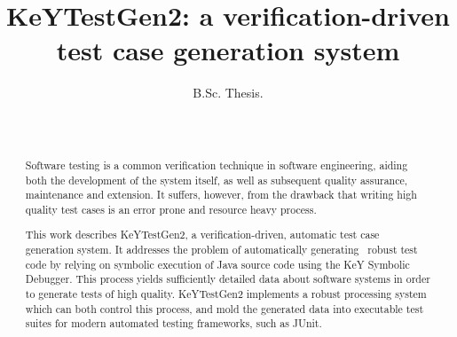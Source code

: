 \documentclass{article}
\begin{document}
\title{KeYTestGen2: a verification-driven test case generation
system}
\author{B.Sc. Thesis.\\
\\
\\
}
\maketitle





\begin{abstract}
  Software testing is a common verification technique in software engineering,
  aiding both the development of the system itself, as well as subsequent
  quality assurance, maintenance and extension. It suffers, however, from the
  drawback that writing high quality test cases is an error prone and resource
  heavy process.
  
  
  
  This work describes KeYTestGen2, a verification-driven, automatic test case
  generation system. It addresses the problem of automatically generating \
  robust test code by relying on symbolic execution of Java source code using
  the KeY Symbolic Debugger. This process yields sufficiently detailed data
  about software systems in order to generate tests of high quality.
  KeYTestGen2 implements a robust processing system which can both control
  this process, and mold the generated data into executable test suites for
  modern automated testing frameworks, such as JUnit. 
\end{abstract}
\end{document}

